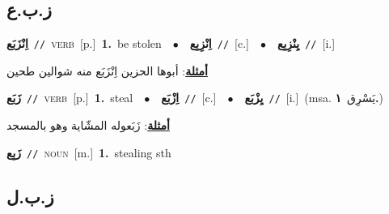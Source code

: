 \documentclass[10pt,a4paper,twoside]{article} %
\begin{document}
\begin{multicols}{2}
\vspace{-3mm}
\subsection*{\color{blue}\foreignlanguage{arabic}{ز.ب.ع}\color{blue}{}} 

{\setlength\topsep{0pt}\textbf{\foreignlanguage{arabic}{اِنْزَبَع}}\ {\color{gray}\texttt{//}\color{black}}\ \textsc{verb}\ [p.]\ \textbf{1.}~be stolen\ \ $\bullet$\ \ \setlength\topsep{0pt}\textbf{\foreignlanguage{arabic}{اِنْزِبِع}}\ {\color{gray}\texttt{//}\color{black}}\ [c.]\ \ $\bullet$\ \ \setlength\topsep{0pt}\textbf{\foreignlanguage{arabic}{يِنْزِبِع}}\ {\color{gray}\texttt{//}\color{black}}\ [i.]\  \begin{flushright}\color{gray}\foreignlanguage{arabic}{\textbf{\underline{\foreignlanguage{arabic}{أمثلة}}}: أبوها الحزين اِنْزَبَع منه شوالين طحين}\end{flushright}\color{black}} \vspace{2mm}

{\setlength\topsep{0pt}\textbf{\foreignlanguage{arabic}{زَبَع}}\ {\color{gray}\texttt{//}\color{black}}\ \textsc{verb}\ [p.]\ \textbf{1.}~steal\ \ $\bullet$\ \ \setlength\topsep{0pt}\textbf{\foreignlanguage{arabic}{اِزْبَع}}\ {\color{gray}\texttt{//}\color{black}}\ [c.]\ \ $\bullet$\ \ \setlength\topsep{0pt}\textbf{\foreignlanguage{arabic}{يِزْبَع}}\ {\color{gray}\texttt{//}\color{black}}\ [i.]\ \color{gray}(msa. \foreignlanguage{arabic}{يَسْرِق}~\foreignlanguage{arabic}{\textbf{١.}})\color{black}\  \begin{flushright}\color{gray}\foreignlanguage{arabic}{\textbf{\underline{\foreignlanguage{arabic}{أمثلة}}}: زَبَعوله المشّاية وهو بالمسجد}\end{flushright}\color{black}} \vspace{2mm}

{\setlength\topsep{0pt}\textbf{\foreignlanguage{arabic}{زَبِع}}\ {\color{gray}\texttt{//}\color{black}}\ \textsc{noun}\ [m.]\ \textbf{1.}~stealing sth\ } \vspace{2mm}

\vspace{-3mm}
\subsection*{\color{blue}\foreignlanguage{arabic}{ز.ب.ل}\color{blue}{}} 


\end{multicols}
\end{document}
